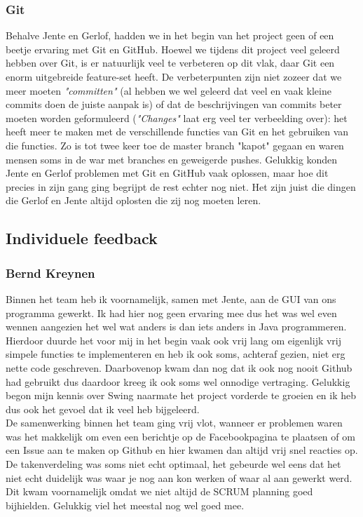 \documentclass[a4paper,11pt]{article}
\begin{document}
\subsubsection{Git}
Behalve Jente en Gerlof, hadden we in het begin van het project geen of een beetje ervaring met Git en GitHub. Hoewel we tijdens dit project veel geleerd hebben over Git, is er natuurlijk veel te verbeteren op dit vlak, daar Git een enorm uitgebreide feature-set heeft. De verbeterpunten zijn niet zozeer dat we meer moeten \textit{"committen"} (al hebben we wel geleerd dat veel en vaak kleine commits doen de juiste aanpak is) of dat de beschrijvingen van commits beter moeten worden geformuleerd (\textit{"Changes"} laat erg veel ter verbeelding over): het heeft meer te maken met de verschillende functies van Git en het gebruiken van die functies. Zo is tot twee keer toe de master branch "kapot" gegaan en waren mensen soms in de war met branches en geweigerde pushes. Gelukkig konden Jente en Gerlof problemen met Git en GitHub vaak oplossen, maar hoe dit precies in zijn gang ging begrijpt de rest echter nog niet. Het zijn juist die
dingen die Gerlof en Jente altijd oplosten die zij nog moeten leren.

\subsection{Individuele feedback}
\subsubsection{Bernd Kreynen}
Binnen het team heb ik voornamelijk, samen met Jente, aan de GUI van ons programma gewerkt. Ik had hier nog geen ervaring mee dus het was wel even wennen aangezien het wel wat anders is dan iets anders in Java programmeren. Hierdoor duurde het voor mij in het begin vaak ook vrij lang om eigenlijk vrij simpele functies te implementeren en heb ik ook soms, achteraf gezien, niet erg nette code geschreven. Daarbovenop kwam dan nog dat ik ook nog nooit Github had gebruikt dus daardoor kreeg ik ook soms wel onnodige vertraging. Gelukkig begon mijn kennis over Swing naarmate het project vorderde te groeien en ik heb dus ook het gevoel dat ik veel heb bijgeleerd.\\

De samenwerking binnen het team ging vrij vlot, wanneer er problemen waren was het makkelijk om even een berichtje op de Facebookpagina te plaatsen of om een Issue aan te maken op Github en hier kwamen dan altijd vrij snel reacties op. De takenverdeling was soms niet echt optimaal, het gebeurde wel eens dat het niet echt duidelijk was waar je nog aan kon werken of waar al aan gewerkt werd. Dit kwam voornamelijk omdat we niet altijd de SCRUM planning goed bijhielden. Gelukkig viel het meestal nog wel goed mee.
\end{document}
